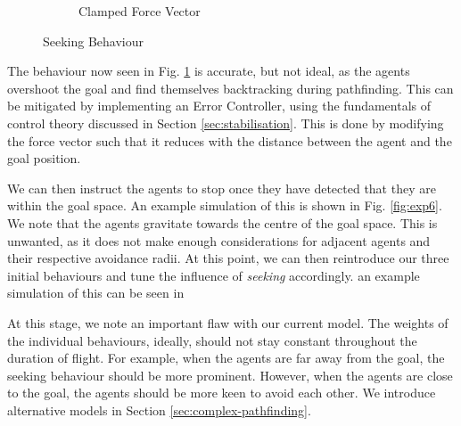 \documentclass{article}
\begin{document}
\begin{figure}[H]
\begin{subfigure}{.45\textwidth}
\caption{Clamped Force Vector}
\label{fig:exp5}
\end{subfigure}
\caption{Seeking Behaviour}
\label{fig:exp45}
\end{figure}

The behaviour now seen in Fig. \ref{fig:exp5} is accurate, but not ideal, as the agents overshoot the goal and find themselves backtracking during pathfinding. This can be mitigated by implementing an Error Controller, using the fundamentals of control theory discussed in Section \ref{sec:stabilisation}. This is done by modifying the force vector such that it reduces with the distance between the agent and the goal position.

We can then instruct the agents to stop once they have detected that they are within the goal space. An example simulation of this is shown in Fig. \ref{fig:exp6}. We note that the agents gravitate towards the centre of the goal space. This is unwanted, as it does not make enough considerations for adjacent agents and their respective avoidance radii. At this point, we can then reintroduce our three initial behaviours and tune the influence of \emph{seeking} accordingly. an example simulation of this can be seen in

At this stage, we note an important flaw with our current model. The weights of the individual behaviours, ideally, should not stay constant throughout the duration of flight. For example, when the agents are far away from the goal, the seeking behaviour should be more prominent. However, when the agents are close to the goal, the agents should be more keen to avoid each other. We introduce alternative models in Section \ref{sec:complex-pathfinding}.
\end{document}
